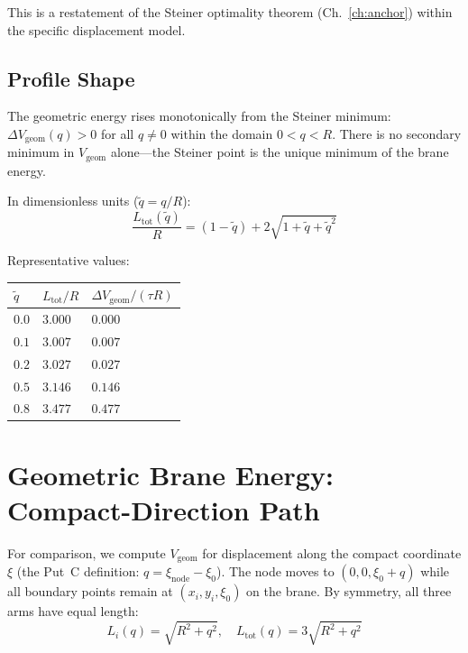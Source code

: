This is a restatement of the Steiner optimality theorem
(Ch.~\ref{ch:anchor}) within the specific displacement model.

\subsection{Profile Shape}

The geometric energy rises monotonically from the Steiner minimum:
$\Delta V_{\mathrm{geom}}(q) > 0$ for all $q \neq 0$ within the domain
$0 < q < R$. There is no secondary minimum in $V_{\mathrm{geom}}$
alone---the Steiner point is the unique minimum of the brane
energy.

In dimensionless units ($\tilde{q} = q/R$):
\begin{equation}
    \frac{L_{\mathrm{tot}}(\tilde{q})}{R}
    = (1 - \tilde{q}) + 2\sqrt{1 + \tilde{q} + \tilde{q}^2}
    \label{eq:Ltot_dimless}
\end{equation}

\noindent Representative values:
\begin{center}
\begin{tabular}{lll}
\toprule
$\tilde{q}$ & $L_{\mathrm{tot}}/R$ & $\Delta V_{\mathrm{geom}} / (\tau R)$ \\
\midrule
$0.0$ & $3.000$ & $0.000$ \\
$0.1$ & $3.007$ & $0.007$ \\
$0.2$ & $3.027$ & $0.027$ \\
$0.5$ & $3.146$ & $0.146$ \\
$0.8$ & $3.477$ & $0.477$ \\
\bottomrule
\end{tabular}
\end{center}

\section{Geometric Brane Energy: Compact-Direction Path}
\label{sec:vq:compact}

For comparison, we compute $V_{\mathrm{geom}}$ for displacement along the
compact coordinate $\xi$ (the Put~C definition: $q = \xi_{\mathrm{node}} -
\xi_0$). The node moves to $(0, 0, \xi_0 + q)$ while all boundary points
remain at $(x_i, y_i, \xi_0)$ on the brane. By symmetry, all three arms
have equal length:
\begin{equation}
    L_i(q) = \sqrt{R^2 + q^2}, \quad
    L_{\mathrm{tot}}(q) = 3\sqrt{R^2 + q^2}
    \label{eq:Ltot_compact}
\end{equation}

